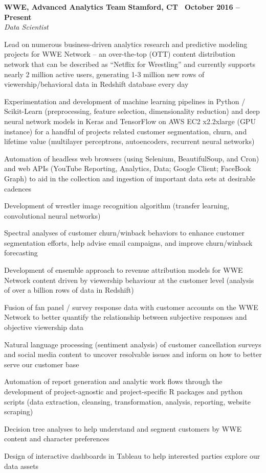 \documentclass[10pt]{article}
\newcommand{\leftandright}[2]{\noindent\textbf{#1}\hfill
\textbf{#2}}
\begin{document}
\leftandright{WWE, Advanced Analytics Team}{Stamford, CT \textbullet\, October
2016 -- Present} \\  
\vspace{-0.8em}
\textit{Data Scientist} 
\begin{itemize*}
  \item Lead on numerous business-driven analytics research and
    predictive modeling projects for WWE Network -- an
    over-the-top (OTT) content distribution network  that can be
    described as ``Netflix for Wrestling'' and currently supports nearly
    2 million active users, generating 1-3 million new rows of viewership/behavioral 
    data in Redshift database every day
  \item Experimentation and development of machine learning pipelines
    in Python / Scikit-Learn (preprocessing, feature selection, dimensionality reduction) and 
    deep neural network models in Keras and TensorFlow 
    on AWS EC2 x2.2xlarge (GPU instance) for a handful of projects related customer segmentation, churn, 
    and lifetime value (multilayer perceptrons, autoencoders, recurrent
    neural networks) 
  \item Automation of headless web browsers (using Selenium,
    BeautifulSoup, and Cron) and web APIs (YouTube Reporting, Analytics,
    Data; Google Client; FaceBook Graph) to aid in the collection and
    ingestion of important data sets at desirable cadences
  \item  Development of wrestler image recognition algorithm (transfer learning,
    convolutional neural networks)
  \item  Spectral analyses of customer churn/winback behaviors 
    to enhance customer segmentation efforts, help advise email campaigns, and
    improve churn/winback forecasting 
  \item Development of ensemble approach to revenue attribution models for WWE Network content
    driven by viewership behaviour at the customer level (analysis of
    over a billion rows of data in Redshift)
  \item  Fusion of fan panel / survey response data with customer accounts on the
    WWE Network to better quantify the relationship between
    subjective responses and objective viewership data
  \item Natural language processing (sentiment analysis) of customer cancellation surveys
    and social media content to uncover resolvable issues and inform on
    how to better serve our customer base
  \item  Automation of report generation and analytic work flows
    through the development of project-agnostic and project-specific R packages 
    and python scripts
    (data extraction, cleansing, transformation, analysis, reporting,
    website scraping)
  \item  Decision tree analyses to help understand and segment
    customers by WWE content and character preferences
  \item Design of interactive dashboards in Tableau to help interested
    parties explore our data assets
\end{itemize*}
\end{document}
